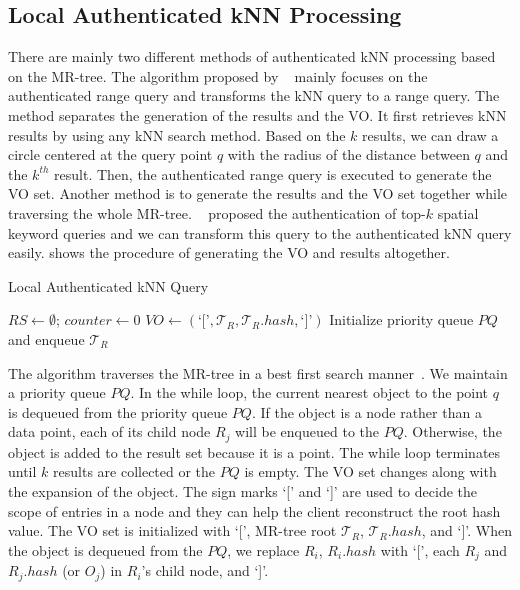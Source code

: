 \subsection{Local Authenticated kNN Processing}
There are mainly two different methods of authenticated kNN processing based on the MR-tree. The algorithm proposed by \citeauthor{10.1007/s00778-008-0113-2}~\cite{10.1007/s00778-008-0113-2} mainly focuses on the authenticated range query and transforms the kNN query to a range query. The method separates the generation of the results and the VO\@. It first retrieves kNN results by using any kNN search method. Based on the $k$ results, we can draw a circle centered at the query point $q$ with the radius of the distance between $q$ and the $k^{th}$ result. Then, the authenticated range query is executed to generate the VO set. Another method is to generate the results and the VO set together while traversing the whole MR-tree. \citeauthor{10.1007/978-3-319-18120-2_33}~\cite{10.1007/978-3-319-18120-2_33} proposed the authentication of top-$k$ spatial keyword queries and we can transform this query to the authenticated kNN query easily.  shows the procedure of generating the VO and results altogether.

\begin{algorithm}[t]
  \caption{Local Authenticated kNN Query}\label{alg:knn:knn}
  $RS \gets \emptyset$; $counter \gets 0$\;
  $VO \gets (\textrm{`['}, \mathcal{T}_R, \mathcal{T}_R.hash, \textrm{`]'})$\; %
  Initialize priority queue $PQ$ and enqueue $\mathcal{T}_R$\;
  \;
\end{algorithm}

The algorithm traverses the MR-tree in a best first search manner~\cite{10.1145/320248.320255}. We maintain a priority queue $PQ$. In the while loop, the current nearest object to the point $q$ is dequeued from the priority queue $PQ$. If the object is a node rather than a data point, each of its child node $R_{j}$ will be enqueued to the $PQ$. Otherwise, the object is added to the result set because it is a point. The while loop terminates until $k$ results are collected or the $PQ$ is empty. The VO set changes along with the expansion of the object. The sign marks `[' and `]' are used to decide the scope of entries in a node and they can help the client reconstruct the root hash value. The VO set is initialized with `[', MR-tree root $\mathcal{T}_R$, $\mathcal{T}_R.hash$, and `]'. When the object is dequeued from the $PQ$, we replace $R_{i}$, $R_{i}.hash$ with `[', each $R_{j}$ and $R_{j}.hash$ (or $O_{j}$) in $R_{i}$'s child node, and `]'.

